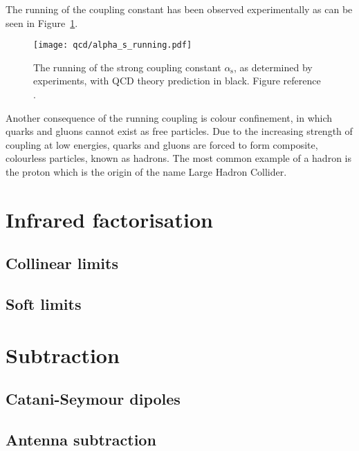 \documentclass[main.tex]{subfiles}
\begin{document}
    The running of the coupling constant has been
    observed experimentally as can be seen in Figure~\ref{fig:alpha_s_running}.
    \begin{figure}
        \texttt{[image: qcd/alpha\_s\_running.pdf]}
        \caption{The running of the strong coupling constant $\alpha_{\mathrm{s}}$,
        as determined by experiments, with QCD theory prediction in black.
        Figure reference \cite{Workman:2022ynf}.}
        \label{fig:alpha_s_running}
    \end{figure}
    Another consequence of the running coupling
    is colour confinement, in which quarks and
    gluons cannot exist as free particles. Due
    to the increasing strength of coupling at low
    energies, quarks and gluons are forced to
    form composite, colourless particles, known as
    hadrons. The most common example of a hadron
    is the proton which is the origin of the name
    Large Hadron Collider.
\section{Infrared factorisation}
\subsection{Collinear limits}
\subsection{Soft limits}
\section{Subtraction}
\subsection{Catani-Seymour dipoles}
\subsection{Antenna subtraction}
\end{document}

